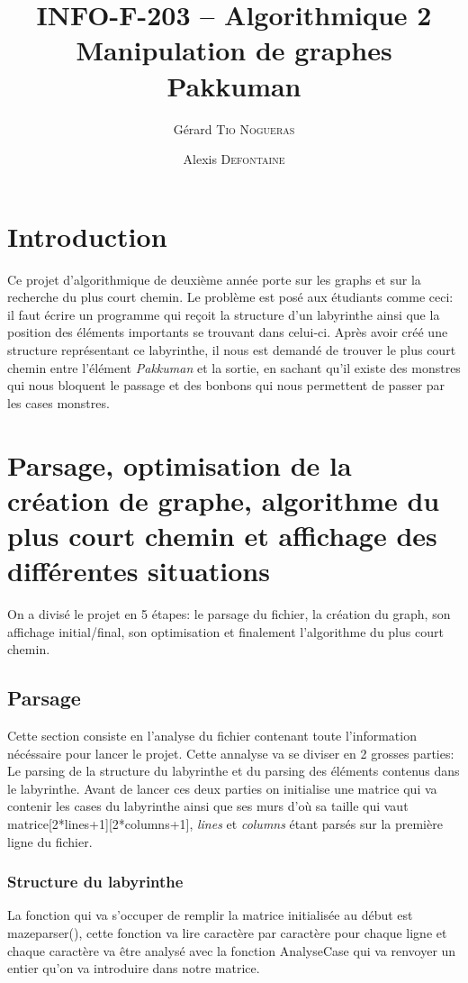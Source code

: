 \documentclass[12pt, oneside]{article}
\title{{\normalsize{INFO-F-203 -- Algorithmique 2}}\\Manipulation de graphes\\ Pakkuman}
\author{Gérard \textsc{Tio Nogueras} \and Alexis \textsc{Defontaine}}
\begin{document}
\maketitle

\section{Introduction}
Ce projet d'algorithmique de deuxième année porte sur les graphs et sur la recherche du plus court chemin.
Le problème est posé aux étudiants comme ceci: il faut écrire un programme qui reçoit la structure d'un labyrinthe ainsi que la position des éléments importants se trouvant dans celui-ci. 
Après avoir créé une structure représentant ce labyrinthe, il nous est demandé de trouver le plus court chemin entre l'élément \emph{Pakkuman} et la sortie, en sachant qu'il existe des monstres qui nous bloquent le passage et des bonbons qui nous permettent de passer par les cases monstres.
\section{Parsage, optimisation de la création de graphe, algorithme du plus court chemin et affichage des différentes situations}
On a divisé le projet en 5 étapes: le parsage du fichier, la création du graph, son affichage initial/final, son optimisation et finalement l'algorithme du plus court chemin.
\subsection{Parsage}
Cette section consiste en l'analyse du fichier contenant toute l'information nécéssaire pour lancer le projet. Cette annalyse va se diviser en 2 grosses parties: Le parsing de la structure du labyrinthe et du parsing des éléments contenus dans le labyrinthe. Avant de lancer ces deux parties on initialise une matrice qui va contenir les cases du labyrinthe  ainsi que ses murs d'où sa taille qui vaut matrice[2*lines+1][2*columns+1], \emph{lines} et \emph{columns} étant parsés sur la première ligne du fichier. 
 
\subsubsection{Structure du labyrinthe}
La fonction qui va s'occuper de remplir la matrice initialisée au début est maze\textunderscore parser(), cette fonction va lire caractère par caractère pour chaque ligne et chaque caractère va être analysé avec la fonction Analyse\textunderscore Case qui va renvoyer un entier qu'on va introduire dans notre matrice.
\end{document}
